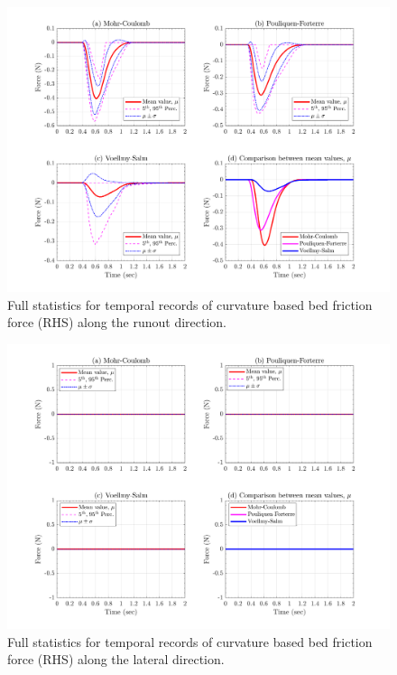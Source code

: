 \documentclass{article}
\begin{document}
\begin{figure}[H]
        \centering
        \includegraphics[width=1\textwidth]{InclinedPlane/GlobalRecords/Fbedcx.png}
        \caption{Full statistics for temporal records of curvature based bed friction force (RHS) along the runout direction.}
        \label{fig:Ramp-Fbedcx}
\end{figure}

\begin{figure}[H]
        \centering
        \includegraphics[width=1\textwidth]{InclinedPlane/GlobalRecords/Fbedcy.png}
        \caption{Full statistics for temporal records of curvature based bed friction force (RHS) along the lateral direction.}
        \label{fig:Ramp-Fbedcy}
\end{figure}
\end{document}
